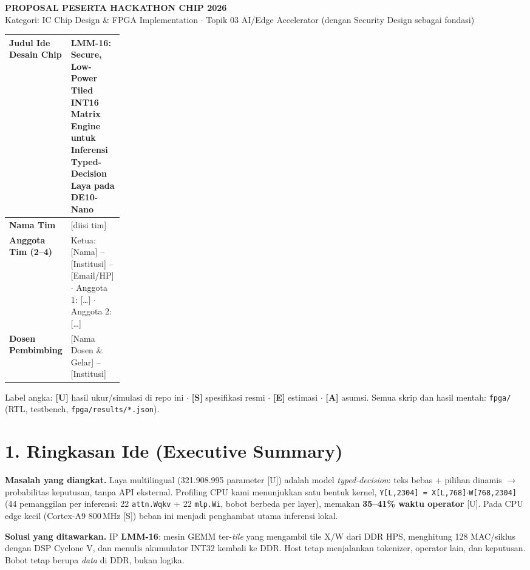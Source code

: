 \documentclass[9pt]{extarticle}
\newcommand{\hd}[1]{\cellcolor{thbg}\textbf{#1}}
\newcommand{\code}[1]{\colorbox{bg2}{\footnotesize\texttt{#1}}}
\newcommand{\note}[1]{{\color{mut}\scriptsize #1}}
\begin{document}
\footnotesize

{\color{acc}\Large\bfseries PROPOSAL PESERTA HACKATHON CHIP 2026}\\[0.5mm]
{\color{mut}\small Kategori: IC Chip Design \& FPGA Implementation $\cdot$ Topik 03 AI/Edge Accelerator (dengan Security Design sebagai fondasi)}

\vspace{1.5mm}
{\scriptsize
\begin{tabularx}{\linewidth}{|p{0.22\linewidth}|L|}
\hline
\hd{Judul Ide Desain Chip} & \textbf{LMM-16: Secure, Low-Power Tiled INT16 Matrix Engine untuk Inferensi Typed-Decision Laya pada DE10-Nano} \\ \hline
\hd{Nama Tim} & [diisi tim] \\ \hline
\hd{Anggota Tim (2--4)} & Ketua: [Nama] -- [Institusi] -- [Email/HP] $\cdot$ Anggota 1: [\dots] $\cdot$ Anggota 2: [\dots] \\ \hline
\hd{Dosen Pembimbing} & [Nama Dosen \& Gelar] -- [Institusi] \\ \hline
\end{tabularx}}

\note{Label angka: \textbf{[U]} hasil ukur/simulasi di repo ini $\cdot$ \textbf{[S]} spesifikasi resmi $\cdot$ \textbf{[E]} estimasi $\cdot$ \textbf{[A]} asumsi. Semua skrip dan hasil mentah: \texttt{fpga/} (RTL, testbench, \texttt{fpga/results/*.json}).}

\section{1. Ringkasan Ide (Executive Summary)}
\textbf{Masalah yang diangkat.} Laya multilingual (321.908.995 parameter [U]) adalah model \emph{typed-decision}: teks bebas + pilihan dinamis $\rightarrow$ probabilitas keputusan, tanpa API eksternal. Profiling CPU kami menunjukkan satu bentuk kernel, \code{Y[L,2304] = X[L,768]$\cdot$W[768,2304]} (44 pemanggilan per inferensi: 22 \code{attn.Wqkv} + 22 \code{mlp.Wi}, bobot berbeda per layer), memakan \textbf{35--41\% waktu operator} [U]. Pada CPU edge kecil (Cortex-A9 800\,MHz [S]) beban ini menjadi penghambat utama inferensi lokal.

\textbf{Solusi yang ditawarkan.} IP \textbf{LMM-16}: mesin GEMM ter-\emph{tile} yang mengambil tile X/W dari DDR HPS, menghitung 128 MAC/siklus dengan DSP Cyclone V, dan menulis akumulator INT32 kembali ke DDR. Host tetap menjalankan tokenizer, operator lain, dan keputusan. Bobot tetap berupa \emph{data} di DDR, bukan logika.
\end{document}
